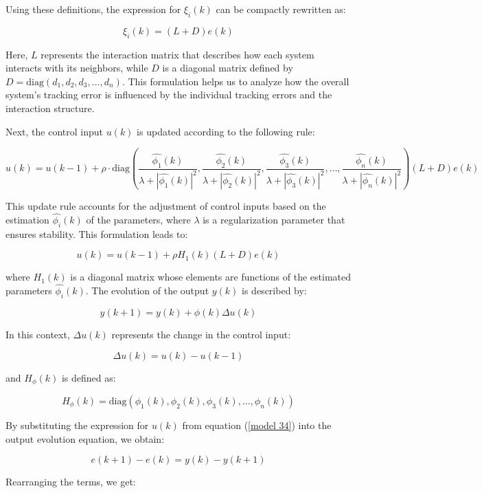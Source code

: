 \documentclass[journal,onecolumn]{IEEEtran}
\begin{document}
Using these definitions, the expression for \(\xi_i(k)\) can be compactly rewritten as:

\begin{equation}
    \label{model 33}
    \xi_i(k) = (L + D) e(k)
\end{equation}

Here, \(L\) represents the interaction matrix that describes how each system interacts with its neighbors, while \(D\) is a diagonal matrix defined by \(D = \text{diag}(d_1, d_2, d_3, \dots, d_n)\). This formulation helps us to analyze how the overall system's tracking error is influenced by the individual tracking errors and the interaction structure.

Next, the control input \(u(k)\) is updated according to the following rule:

\[
u(k) = u(k-1) + \rho \cdot \text{diag}\left(\frac{\hat{\phi_1}(k)}{\lambda + |\hat{\phi_1}(k)|^2}, \frac{\hat{\phi_2}(k)}{\lambda + |\hat{\phi_2}(k)|^2}, \frac{\hat{\phi_3}(k)}{\lambda + |\hat{\phi_3}(k)|^2}, \dots, \frac{\hat{\phi_n}(k)}{\lambda + |\hat{\phi_n}(k)|^2}\right) (L + D) e(k)
\]

This update rule accounts for the adjustment of control inputs based on the estimation \(\hat{\phi_i}(k)\) of the parameters, where \(\lambda\) is a regularization parameter that ensures stability. This formulation leads to:

\begin{equation}
    \label{model 34}
    u(k) = u(k-1) + \rho H_1(k) (L + D) e(k)
\end{equation}

where \(H_1(k)\) is a diagonal matrix whose elements are functions of the estimated parameters \(\hat{\phi_i}(k)\). The evolution of the output \(y(k)\) is described by:

\[
y(k+1) = y(k) + \phi(k) \Delta u(k)
\]

In this context, \(\Delta u(k)\) represents the change in the control input:

\[
\Delta u(k) = u(k) - u(k-1)
\]

and \(H_\phi(k)\) is defined as:

\[
H_\phi(k) = \text{diag}(\phi_1(k), \phi_2(k), \phi_3(k), \dots, \phi_n(k))
\]

By substituting the expression for \(u(k)\) from equation (\ref{model 34}) into the output evolution equation, we obtain:

\[
e(k+1) - e(k) = y(k) - y(k+1)
\]

Rearranging the terms, we get:
\end{document}
